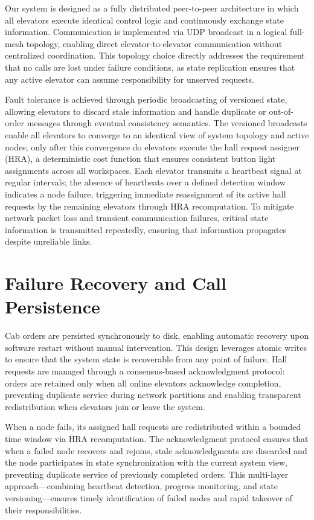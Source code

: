 \documentclass[12pt,a4paper]{article}
\begin{document}
Our system is designed as a fully distributed peer-to-peer architecture in which all elevators execute identical control logic and continuously exchange state information. Communication is implemented via UDP broadcast in a logical full-mesh topology, enabling direct elevator-to-elevator communication without centralized coordination. This topology choice directly addresses the requirement that no calls are lost under failure conditions, as state replication ensures that any active elevator can assume responsibility for unserved requests.

Fault tolerance is achieved through periodic broadcasting of versioned state, allowing elevators to discard stale information and handle duplicate or out-of-order messages through eventual consistency semantics. The versioned broadcasts enable all elevators to converge to an identical view of system topology and active nodes; only after this convergence do elevators execute the hall request assigner (HRA), a deterministic cost function that ensures consistent button light assignments across all workspaces. Each elevator transmits a heartbeat signal at regular intervals; the absence of heartbeats over a defined detection window indicates a node failure, triggering immediate reassignment of its active hall requests by the remaining elevators through HRA recomputation. To mitigate network packet loss and transient communication failures, critical state information is transmitted repeatedly, ensuring that information propagates despite unreliable links.

\section*{Failure Recovery and Call Persistence}

Cab orders are persisted synchronously to disk, enabling automatic recovery upon software restart without manual intervention. This design leverages atomic writes to ensure that the system state is recoverable from any point of failure. Hall requests are managed through a consensus-based acknowledgment protocol: orders are retained only when all online elevators acknowledge completion, preventing duplicate service during network partitions and enabling transparent redistribution when elevators join or leave the system.

When a node fails, its assigned hall requests are redistributed within a bounded time window via HRA recomputation. The acknowledgment protocol ensures that when a failed node recovers and rejoins, stale acknowledgments are discarded and the node participates in state synchronization with the current system view, preventing duplicate service of previously completed orders. This multi-layer approach---combining heartbeat detection, progress monitoring, and state versioning---ensures timely identification of failed nodes and rapid takeover of their responsibilities.
\end{document}
